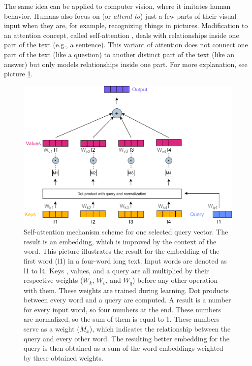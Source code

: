 The same idea can be applied to computer vision, where it imitates human behavior. Humans also focus on (or \textit{attend to}) just a few parts of their visual input when they are, for example, recognizing things in pictures.
Modification to an attention concept, called self-attention \citep{Cheng}, deals with relationships inside one part of the text (e.g., a sentence). This variant of attention does not connect one part of the text (like a question) to another distinct part of the text (like an answer) but only models relationships inside one part. For more explanation, see picture \ref{pic:att_self}.
\begin{figure}[H]
\centering
\includegraphics[width=1\columnwidth]{../img/self_attention1.pdf}
\caption{Self-attention mechanism scheme for one selected query vector. The result is an embedding, which is improved by the context of the word. This picture illustrates the result for the embedding %
of the first word (l1) in a four-word long text. Input words are denoted as l1 to l4. Keys , values, and a query are all multiplied by their respective weights ($W_k$, $W_v$, and $W_q$) before any other operation with them. These weights are trained during learning. Dot products between every word and a query are computed. A result is a number for every input word, so four numbers at the end. These numbers are normalized, so the sum of them is equal to 1. These numbers serve as a weight ($M_x$), which indicates the relationship between the query and every other word. The resulting better embedding for the query is then obtained as a sum of the word embeddings weighted by these obtained weights. %
}
\label{pic:att_self}
\end{figure}
